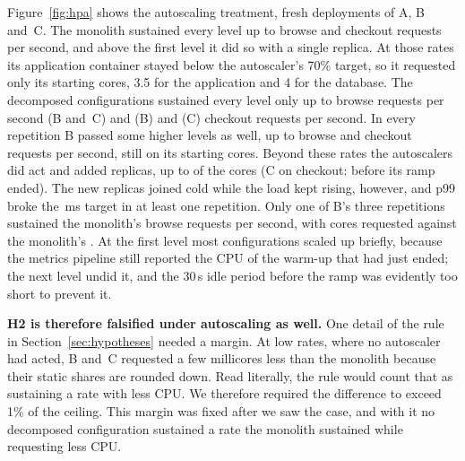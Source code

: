 Figure~\ref{fig:hpa} shows the autoscaling treatment,  fresh deployments of A, B and~C. The monolith
sustained every level up to  browse and  checkout requests
per second, and above the first level it did so with a single replica. At those rates its application container stayed below the
autoscaler's 70\% target, so it requested only its starting  cores, 3.5 for the application
and 4 for the database. The decomposed configurations sustained every level only up to 
browse requests per second (B and~C) and  (B) and  (C)
checkout requests per second. In every repetition B passed some higher levels as well, up to 
browse and  checkout requests per second, still on its starting 
cores. Beyond these rates the autoscalers did act and added replicas, up to  of the
 cores (C on checkout:  before its ramp ended). The new replicas joined cold
while the load kept rising, however, and p99 broke the \,ms target in at least one repetition. Only one
of B's three repetitions sustained the monolith's  browse requests per second, with
 cores requested against the monolith's . At the first level most
configurations scaled up briefly, because the metrics pipeline still reported the CPU of the warm-up that had just
ended; the next level undid it, and the 30\,s idle period before the ramp was evidently too short to prevent it.

\textbf{H2 is therefore falsified under autoscaling as well.} One detail of the rule in
Section~\ref{sec:hypotheses} needed a margin. At low rates, where no autoscaler had acted, B and~C requested a few
millicores less than the monolith because their static shares are rounded down. Read literally, the rule would
count that as sustaining a rate with less CPU. We therefore required the difference to exceed 1\% of the ceiling.
This margin was fixed after we saw the case, and with it no decomposed configuration sustained a rate the monolith
sustained while requesting less CPU.
